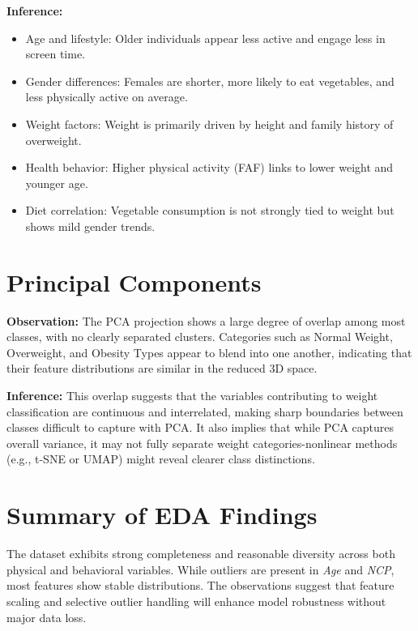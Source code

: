 \textbf{Inference:}
\begin{itemize}
    \item Age and lifestyle: Older individuals appear less active and engage less in screen time.
    \item Gender differences: Females are shorter, more likely to eat vegetables, and less physically active on average.
    \item Weight factors: Weight is primarily driven by height and family history of overweight.
    \item Health behavior: Higher physical activity (FAF) links to lower weight and younger age.
    \item Diet correlation: Vegetable consumption is not strongly tied to weight but shows mild gender trends.
\end{itemize}



\section{Principal Components}\label{sec:principal-components}

\textbf{Observation:}
The PCA projection shows a large degree of overlap among most classes, with no clearly separated clusters.
Categories such as Normal Weight, Overweight, and Obesity Types appear to blend into one another, indicating that their feature distributions are similar in the reduced 3D space.

\textbf{Inference:} This overlap suggests that the variables contributing to weight classification are continuous and interrelated, making sharp boundaries between classes difficult to capture with PCA. It also implies that while PCA captures overall variance, it may not fully separate weight categories-nonlinear methods (e.g., t-SNE or UMAP) might reveal clearer class distinctions.



\section*{Summary of EDA Findings}
The dataset exhibits strong completeness and reasonable diversity across both physical and behavioral variables.
While outliers are present in \textit{Age} and \textit{NCP}, most features show stable distributions.
The observations suggest that feature scaling and selective outlier handling will enhance model robustness without major data loss.

